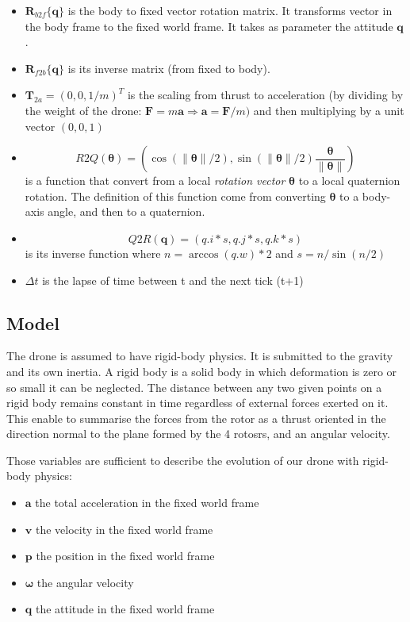 \documentclass[12pt,]{article}
\providecommand{\tightlist}{%
  \setlength{\itemsep}{0pt}\setlength{\parskip}{0pt}}
\begin{document}
\begin{itemize}
\tightlist
\item
  \(\mathbf{R}_{b2f}\{\mathbf{q}\}\) is the body to fixed vector
  rotation matrix. It transforms vector in the body frame to the fixed
  world frame. It takes as parameter the attitude \(\mathbf{q}\).
\item
  \(\mathbf{R}_{f2b}\{\mathbf{q}\}\) is its inverse matrix (from fixed
  to body).
\item
  \(\mathbf{T}_{2a} = (0, 0, 1/m)^T\) is the scaling from thrust to
  acceleration (by dividing by the weight of the drone:
  \(\mathbf{F} = m\mathbf{a} \Rightarrow \mathbf{a} = \mathbf{F}/m)\)
  and then multiplying by a unit vector \((0, 0, 1)\)
\item
  \[R2Q(\boldsymbol{\theta}) = (\cos(\| \boldsymbol{\theta} \| / 2), \sin(\| \boldsymbol{\theta} \| / 2) \frac{\boldsymbol{\theta}}{\| \boldsymbol{\theta} \|} )\]
  is a function that convert from a local \emph{rotation vector}
  \(\boldsymbol{\theta}\) to a local quaternion rotation. The definition
  of this function come from converting \(\boldsymbol{\theta}\) to a
  body-axis angle, and then to a quaternion.
\item
  \[Q2R(\mathbf{q}) = (q.i*s, q.j*s, q.k*s) \] is its inverse function
  where \(n = \arccos(q.w)*2\) and \(s = n/\sin(n/2)\)
\item
  \(\Delta t\) is the lapse of time between t and the next tick (t+1)
\end{itemize}

\subsection{Model}\label{model}

The drone is assumed to have rigid-body physics. It is submitted to the
gravity and its own inertia. A rigid body is a solid body in which
deformation is zero or so small it can be neglected. The distance
between any two given points on a rigid body remains constant in time
regardless of external forces exerted on it. This enable to summarise
the forces from the rotor as a thrust oriented in the direction normal
to the plane formed by the 4 rotosrs, and an angular velocity.

Those variables are sufficient to describe the evolution of our drone
with rigid-body physics:

\begin{itemize}
\tightlist
\item
  \(\mathbf{a}\) the total acceleration in the fixed world frame
\item
  \(\mathbf{v}\) the velocity in the fixed world frame
\item
  \(\mathbf{p}\) the position in the fixed world frame
\item
  \(\boldsymbol{\omega}\) the angular velocity
\item
  \(\mathbf{q}\) the attitude in the fixed world frame
\end{itemize}
\end{document}
